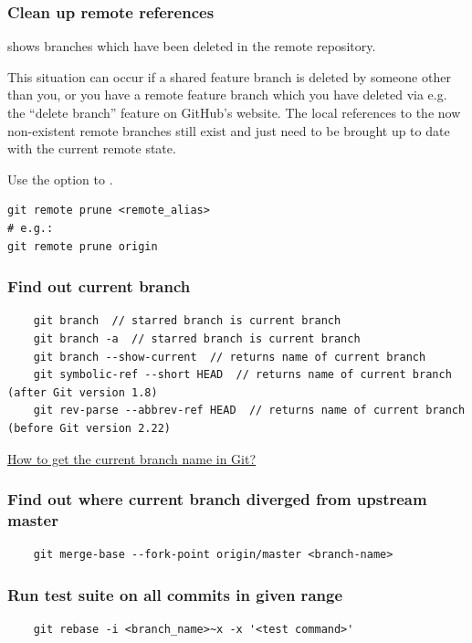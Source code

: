 \documentclass{git_course}
\begin{document}
\begin{frame}[fragile]
    \frametitle{Clean up remote references}

      shows branches which have been
    deleted in the remote repository.

    This situation can occur if a shared feature branch is deleted by
    someone other than you, or you have a remote feature branch which you
    have deleted via e.g. the ``delete branch'' feature on GitHub's website.
    The local references to the now non-existent remote branches still exist
    and just need to be brought up to date with the current remote state.

     Use the  option to .

\begin{lstlisting}
git remote prune <remote_alias>
# e.g.:
git remote prune origin
\end{lstlisting}
\end{frame}

\begin{frame}[fragile]
    \frametitle{Find out current branch}
    \begin{lstlisting}
    git branch  // starred branch is current branch
    git branch -a  // starred branch is current branch
    git branch --show-current  // returns name of current branch
    git symbolic-ref --short HEAD  // returns name of current branch (after Git version 1.8)
    git rev-parse --abbrev-ref HEAD  // returns name of current branch (before Git version 2.22)
    \end{lstlisting}
    \href{https://stackoverflow.com/questions/6245570/how-to-get-the-current-branch-name-in-git}{How to get the current branch name in Git?}
\end{frame}

\begin{frame}[fragile]
    \frametitle{Find out where current branch diverged from upstream master}
    \begin{lstlisting}
    git merge-base --fork-point origin/master <branch-name>
    \end{lstlisting}
\end{frame}

\begin{frame}[fragile]
    \frametitle{Run test suite on all commits in given range}
    \begin{lstlisting}
    git rebase -i <branch_name>~x -x '<test command>'
    \end{lstlisting}
\end{frame}
\end{document}
